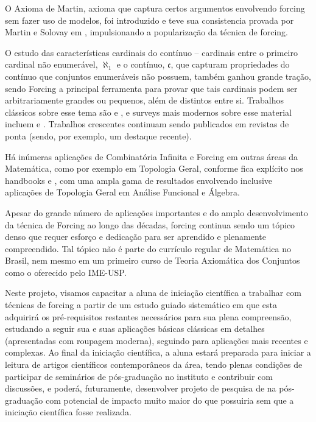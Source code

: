 \documentclass{article}
\begin{document}
    O Axioma de Martin, axioma que captura certos argumentos envolvendo forcing sem fazer uso de modelos, foi introduzido e teve sua consistencia provada por Martin e Solovay em \cite{martin1970internal}, impulsionando a popularização da técnica de forcing.

    O estudo das características cardinais do contínuo -- cardinais entre o primeiro cardinal não enumerável, $\aleph_1$ e o contínuo, $\mathfrak c$, que capturam propriedades do contínuo que conjuntos enumeráveis não possuem, também ganhou grande tração, sendo Forcing a principal ferramenta para provar que tais cardinais podem ser arbitrariamente grandes ou pequenos, além de distintos entre si.
    Trabalhos clássicos sobre esse tema são \cite{bartoszynski1993chichon} e \cite{miller1981some}, e surveys mais modernos sobre esse material incluem \cite{blass2009combinatorial} e \cite{douwen1984integers}. Trabalhos crescentes continuam sendo publicados em revistas de ponta (sendo, por exemplo, \cite{goldstern2019chichon} um destaque recente).

    Há inúmeras aplicações de Combinatória Infinita e Forcing em outras áreas da Matemática, como por exemplo em Topologia Geral, conforme fica explícito nos handbooks \cite{kunen1984handbook} e \cite{foreman2009handbook}, com uma ampla gama de resultados envolvendo inclusive aplicações de Topologia Geral em Análise Funcional e Álgebra.

    Apesar do grande número de aplicações importantes e do amplo desenvolvimento da técnica de Forcing ao longo das décadas, forcing continua sendo um tópico denso que requer esforço e dedicação para ser aprendido e plenamente compreendido. Tal tópico não é parte do currículo regular de Matemática no Brasil, nem mesmo em um primeiro curso de Teoria Axiomática dos Conjuntos como o oferecido pelo IME-USP.

    Neste projeto, visamos capacitar a aluna de iniciação científica a trabalhar com técnicas de forcing a partir de um estudo guiado sistemático em que esta adquirirá os pré-requisitos restantes necessários para sua plena compreensão, estudando a seguir sua e suas aplicações básicas clássicas em detalhes (apresentadas com roupagem moderna), seguindo para aplicações mais recentes e complexas.
    Ao final da iniciação científica, a aluna estará preparada para iniciar a leitura de artigos científicos contemporâneos da área, tendo plenas condições de participar de seminários de pós-graduação no instituto e contribuir com discussões, e poderá, futuramente, desenvolver projeto de pesquisa de na pós-graduação com potencial de impacto muito maior do que possuiria sem que a iniciação científica fosse realizada.
\end{document}
